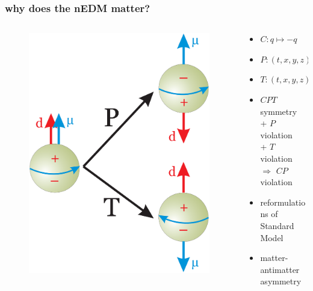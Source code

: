 \documentclass{beamer}
\begin{document}
\begin{frame}
\frametitle{why does the nEDM matter?}

    \begin{columns}
    
    \begin{column}{0.4\textwidth}
    \begin{figure}
    \includegraphics[width=\textwidth]{figures/nEDM_P_T_violation.png}
    \end{figure}
    \end{column}
   
    \begin{column}{0.6\textwidth}
    \begin{itemize}
        \item $C: q \mapsto -q$ \pause
        \item $P: (t, x, y, z) \mapsto (t, x, -y, z)$ \pause
        \item $T: (t, x, y, z) \mapsto (-t, x, y, z)$ \pause
        \bigskip
        \item $CPT$ symmetry \\\pause + $P$ violation \\\pause + $T$ violation \\
        \pause $\Rightarrow$ $CP$ violation \pause
        \bigskip
        \item reformulations of Standard Model
        \item matter-antimatter asymmetry
    \end{itemize}
    \end{column}


\end{columns}
\end{frame}
\end{document}
